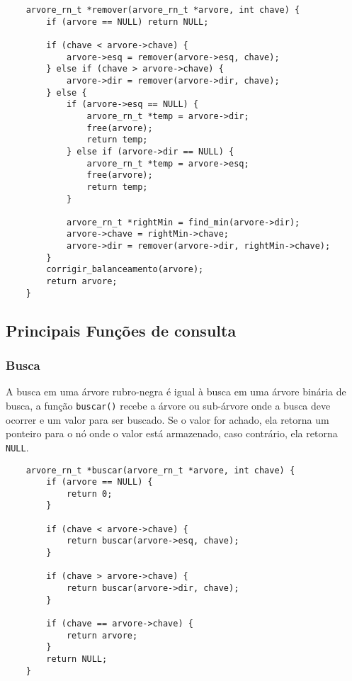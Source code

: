 \begin{lstlisting}
    arvore_rn_t *remover(arvore_rn_t *arvore, int chave) {
        if (arvore == NULL) return NULL;

        if (chave < arvore->chave) {
            arvore->esq = remover(arvore->esq, chave);
        } else if (chave > arvore->chave) {
            arvore->dir = remover(arvore->dir, chave);
        } else {
            if (arvore->esq == NULL) {
                arvore_rn_t *temp = arvore->dir;
                free(arvore);
                return temp;
            } else if (arvore->dir == NULL) {
                arvore_rn_t *temp = arvore->esq;
                free(arvore);
                return temp;
            }

            arvore_rn_t *rightMin = find_min(arvore->dir);
            arvore->chave = rightMin->chave;
            arvore->dir = remover(arvore->dir, rightMin->chave);
        }
        corrigir_balanceamento(arvore);
        return arvore;
    }
\end{lstlisting}

\vspace{3mm}

\subsection{Principais Funções de consulta}

\subsubsection{Busca}

A busca em uma árvore rubro-negra é igual à busca em uma árvore binária de busca, a função \texttt{buscar()} recebe a árvore ou sub-árvore onde a busca deve ocorrer e um valor para ser buscado. Se o valor for achado, ela retorna um ponteiro para o nó onde o valor está armazenado, caso contrário, ela retorna \texttt{NULL}.

\begin{lstlisting}
    arvore_rn_t *buscar(arvore_rn_t *arvore, int chave) {
        if (arvore == NULL) {
            return 0;
        }

        if (chave < arvore->chave) {
            return buscar(arvore->esq, chave);
        }

        if (chave > arvore->chave) {
            return buscar(arvore->dir, chave);
        }

        if (chave == arvore->chave) {
            return arvore;
        }
        return NULL;
    }
\end{lstlisting}


